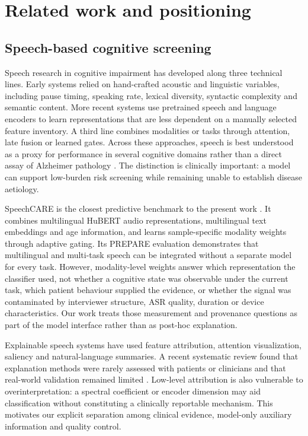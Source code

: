 \documentclass[pdflatex,sn-nature]{sn-jnl}
\begin{document}
\section{Related work and positioning}\label{sec:related}

\subsection{Speech-based cognitive screening}

Speech research in cognitive impairment has developed along three technical lines. Early systems relied on hand-crafted acoustic and linguistic variables, including pause timing, speaking rate, lexical diversity, syntactic complexity and semantic content. More recent systems use pretrained speech and language encoders to learn representations that are less dependent on a manually selected feature inventory. A third line combines modalities or tasks through attention, late fusion or learned gates. Across these approaches, speech is best understood as a proxy for performance in several cognitive domains rather than a direct assay of Alzheimer pathology \cite{Heitz2026}. The distinction is clinically important: a model can support low-burden risk screening while remaining unable to establish disease aetiology.

SpeechCARE is the closest predictive benchmark to the present work \cite{Azadmaleki2025}. It combines multilingual HuBERT audio representations, multilingual text embeddings and age information, and learns sample-specific modality weights through adaptive gating. Its PREPARE evaluation demonstrates that multilingual and multi-task speech can be integrated without a separate model for every task. However, modality-level weights answer which representation the classifier used, not whether a cognitive state was observable under the current task, which patient behaviour supplied the evidence, or whether the signal was contaminated by interviewer structure, ASR quality, duration or device characteristics. Our work treats those measurement and provenance questions as part of the model interface rather than as post-hoc explanation.

Explainable speech systems have used feature attribution, attention visualization, saliency and natural-language summaries. A recent systematic review found that explanation methods were rarely assessed with patients or clinicians and that real-world validation remained limited \cite{Shankar2025}. Low-level attribution is also vulnerable to overinterpretation: a spectral coefficient or encoder dimension may aid classification without constituting a clinically reportable mechanism. This motivates our explicit separation among clinical evidence, model-only auxiliary information and quality control.
\end{document}
